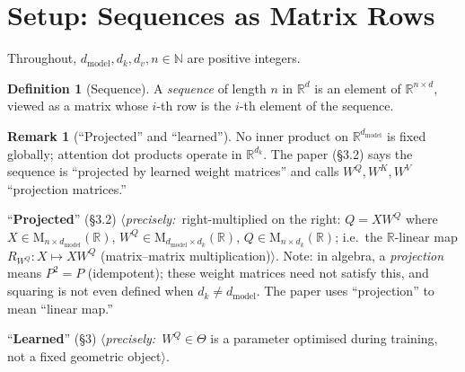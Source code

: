 \documentclass[11pt]{amsart}
\theoremstyle{plain}
\theoremstyle{definition}
\newtheorem{definition}[theorem]{Definition}
\newtheorem{remark}[theorem]{Remark}
\newcommand{\R}{\mathbb{R}}
\newcommand{\N}{\mathbb{N}}
\newcommand{\Mat}[2]{\mathrm{M}_{#1 \times #2}(\R)}
\newcommand{\precise}[1]{%
  $\langle$\textit{precisely:}~#1$\rangle$}
\begin{document}
\section{Setup: Sequences as Matrix Rows}
\label{sec:setup}

Throughout, $d_{\mathrm{model}}, d_k, d_v, n \in \N$ are positive integers.

\begin{definition}[Sequence]
A \emph{sequence} of length $n$ in $\R^d$ is an element of $\R^{n \times d}$,
viewed as a matrix whose $i$-th row is the $i$-th element of the sequence.
\end{definition}

\begin{remark}[``Projected'' and ``learned'']
\label{rem:projection}
No inner product on $\R^{d_{\mathrm{model}}}$ is fixed globally; attention dot
products operate in $\R^{d_k}$.  The paper (\S3.2) says the sequence is
``projected by learned weight matrices'' and calls $W^Q, W^K, W^V$
``projection matrices.''

``\textbf{Projected}'' (\S3.2) \precise{right-multiplied on the right:
$Q = XW^Q$ where $X \in \Mat{n}{d_{\mathrm{model}}}$,
$W^Q \in \Mat{d_{\mathrm{model}}}{d_k}$, $Q \in \Mat{n}{d_k}$;
i.e.\ the $\R$-linear map $R_{W^Q}: X \mapsto XW^Q$ (matrix--matrix
multiplication)}.
Note: in algebra, a \emph{projection} means $P^2 = P$ (idempotent); these
weight matrices need not satisfy this, and squaring is not even defined when
$d_k \neq d_{\mathrm{model}}$.  The paper uses ``projection'' to mean
``linear map.''

``\textbf{Learned}'' (\S3) \precise{$W^Q \in \Theta$ is a parameter
optimised during training, not a fixed geometric object}.
\end{remark}
\end{document}
